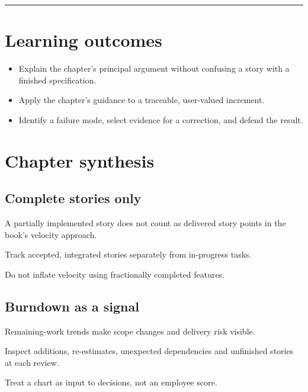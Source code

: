 \documentclass[11pt,letterpaper]{article}
\begin{document}
\tableofcontents\medskip\noindent\rule{\linewidth}{0.4pt}\medskip
\section{Learning outcomes}
\begin{itemize}[leftmargin=*,itemsep=2pt]
\item Explain the chapter's principal argument without confusing a story with a finished specification.
\item Apply the chapter's guidance to a traceable, user-valued increment.
\item Identify a failure mode, select evidence for a correction, and defend the result.
\end{itemize}
\section{Chapter synthesis}
\subsection{Complete stories only}
A partially implemented story does not count as delivered story points in the book’s velocity approach.

\begin{tcolorbox}[colback=tealback,colframe=navy,title={Engineering translation},breakable]
Track accepted, integrated stories separately from in-progress tasks.

\end{tcolorbox}
\begin{tcolorbox}[colback=amberback,colframe=navy,title={Failure mode to watch},breakable]
Do not inflate velocity using fractionally completed features.

\end{tcolorbox}
\subsection{Burndown as a signal}
Remaining-work trends make scope changes and delivery risk visible.

\begin{tcolorbox}[colback=tealback,colframe=navy,title={Engineering translation},breakable]
Inspect additions, re-estimates, unexpected dependencies and unfinished stories at each review.

\end{tcolorbox}
\begin{tcolorbox}[colback=amberback,colframe=navy,title={Failure mode to watch},breakable]
Treat a chart as input to decisions, not an employee score.

\end{tcolorbox}
\end{document}
